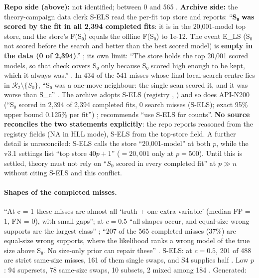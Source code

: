 \begin{uncertain}
\textbf{Repo side (above):} not identified; between 0 and 565 .
\textbf{Archive side:} the theory-campaign data clerk S-ELS read the per-fit top store and reports: ``\textbf{S₀ was scored by the
fit in all 2,394 completed fits}: it is in the 20,001-model top store, and the store's F(S₀) equals the offline F(S₀) to 1e-12. The
event E\_LS (S₀ not scored before the search and better than the best scored model) is \textbf{empty in the data (0 of 2,394)}.''
; its own limit: ``The store holds the top 20,001 scored models, so that check covers
S₀ only because S₀ scored high enough to be kept, which it always was.'' . In 434 of the
541 misses whose final local-search centre lies in $\mathcal R_2\setminus\{S_0\}$, ``S₀ was a one-move neighbour: the single scan
scored it, and it was worse than S\_c'' . The archive adopts S-ELS
 (registry , ) and so does API-N200 (``S₀ scored in 2,394 of 2,394
completed fits, 0 search misses (S-ELS); exact 95\% upper bound 0.125\% per fit'') ;
 recommends ``use S-ELS for counts''. \textbf{No source reconciles the two statements explicitly}: the repo reports
reasoned from the registry fields (NA in HLL mode), S-ELS from the top-store field. A further detail is unreconciled: S-ELS calls
the store ``20,001-model'' at both $p$, while the v3.1 settings list ``top store $40p+1$'' 
($=20{,}001$ only at $p=500$). Until this is settled, theory must not rely on ``$S_0$ scored in every completed fit'' at $p\gg n$
without citing S-ELS and this conflict.
\end{uncertain}

\paragraph{Shapes of the completed misses.}  ``At c = 1 these misses are almost all `truth + one extra variable'
(median FP = 1, FN = 0), with small gaps''; at $c=0.5$ ``all shapes occur, and equal-size wrong supports are the largest class''
; ``207 of the 565 completed misses (37\%) are equal-size wrong
supports, where the likelihood ranks a wrong model of the true size above S₀. No size-only prior can repair these''
. S-ELS: at $c=0.5$, 201 of 488 are strict same-size misses, 161
of them single swaps, and S4 supplies half . Low $p$: 94 supersets, 78 same-size swaps,
10 subsets, 2 mixed among 184 . Generated:


